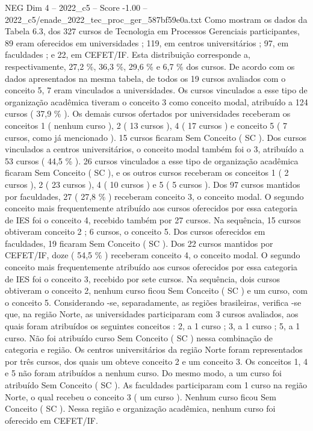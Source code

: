 \begin{textsample}{NEG Dim 4 – 2022\_c5 – Score -1.00 – 2022\_c5/enade\_2022\_tec\_proc\_ger\_587bf59e0a.txt}
Como mostram os dados da Tabela 6.3, dos 327 cursos de Tecnologia em Processos Gerenciais participantes, 89 eram oferecidos em universidades ; 119, em centros universitários ; 97, em faculdades ; e 22, em CEFET/IF.
Esta distribuição corresponde a, respectivamente, 27,2 \%, 36,3 \%, 29,6 \% e 6,7 \% dos cursos.
De acordo com os dados apresentados na mesma tabela, de todos os 19 cursos avaliados com o conceito 5, 7 eram vinculados a universidades.
Os cursos vinculados a esse tipo de organização acadêmica tiveram o conceito 3 como conceito modal, atribuído a 124 cursos ( 37,9 \% ).
Os demais cursos ofertados por universidades receberam os conceitos 1 ( nenhum curso ), 2 ( 13 cursos ), 4 ( 17 cursos ) e conceito 5 ( 7 cursos, como já mencionado ). 15 cursos ficaram Sem Conceito ( SC ).
Dos cursos vinculados a centros universitários, o conceito modal também foi o 3, atribuído a 53 cursos ( 44,5 \% ). 26 cursos vinculados a esse tipo de organização acadêmica ficaram Sem Conceito ( SC ), e os outros cursos receberam os conceitos 1 ( 2 cursos ), 2 ( 23 cursos ), 4 ( 10 cursos ) e 5 ( 5 cursos ).
Dos 97 cursos mantidos por faculdades, 27 ( 27,8 \% ) receberam conceito 3, o conceito modal.
O segundo conceito mais frequentemente atribuído aos cursos oferecidos por essa categoria de IES foi o conceito 4, recebido também por 27 cursos.
Na sequência, 15 cursos obtiveram conceito 2 ; 6 cursos, o conceito 5.
Dos cursos oferecidos em faculdades, 19 ficaram Sem Conceito ( SC ).
Dos 22 cursos mantidos por CEFET/IF, doze ( 54,5 \% ) receberam conceito 4, o conceito modal.
O segundo conceito mais frequentemente atribuído aos cursos oferecidos por essa categoria de IES foi o conceito 3, recebido por sete cursos.
Na sequência, dois cursos obtiveram o conceito 2, nenhum curso ficou Sem Conceito ( SC ) e um curso, com o conceito 5.
Considerando -se, separadamente, as regiões brasileiras, verifica -se que, na região Norte, as universidades participaram com 3 cursos avaliados, aos quais foram atribuídos os seguintes conceitos : 2, a 1 curso ; 3, a 1 curso ; 5, a 1 curso.
Não foi atribuído curso Sem Conceito ( SC ) nessa combinação de categoria e região.
Os centros universitários da região Norte foram representados por três cursos, dos quais um obteve conceito 2 e um conceito 3.
Os conceitos 1, 4 e 5 não foram atribuídos a nenhum curso.
Do mesmo modo, a um curso foi atribuído Sem Conceito ( SC ).
As faculdades participaram com 1 curso na região Norte, o qual recebeu o conceito 3 ( um curso ).
Nenhum curso ficou Sem Conceito ( SC ).
Nessa região e organização acadêmica, nenhum curso foi oferecido em CEFET/IF.

\end{textsample}
